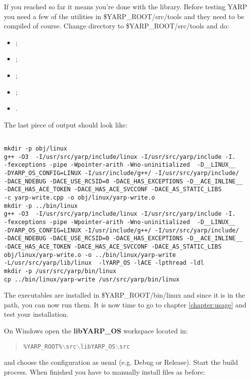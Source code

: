 If you reached so far it means you're done with the library. Before testing YARP you need a few of the utilities in \$YARP\_ROOT/src/tools and they need to be compiled of course. Change directory to \$YARP\_ROOT/src/tools and do:
\begin{itemize}
\item {};
\item {};
\item {};
\item {};
\item {}.
\end{itemize}

The last piece of output should look like:
\begin{verbatim}

mkdir -p obj/linux
g++ -O3  -I/usr/src/yarp/include/linux -I/usr/src/yarp/include -I.  
-fexceptions -pipe -Wpointer-arith -Wno-uninitialized  -D__LINUX__ 
-DYARP_OS_CONFIG=LINUX -I/usr/include/g++/ -I/usr/src/yarp/include/ 
-DACE_NDEBUG -DACE_USE_RCSID=0 -DACE_HAS_EXCEPTIONS -D__ACE_INLINE__ 
-DACE_HAS_ACE_TOKEN -DACE_HAS_ACE_SVCCONF -DACE_AS_STATIC_LIBS   
-c yarp-write.cpp -o obj/linux/yarp-write.o
mkdir -p ../bin/linux
g++ -O3  -I/usr/src/yarp/include/linux -I/usr/src/yarp/include -I.  
-fexceptions -pipe -Wpointer-arith -Wno-uninitialized  -D__LINUX__ 
-DYARP_OS_CONFIG=LINUX -I/usr/include/g++/ -I/usr/src/yarp/include/ 
-DACE_NDEBUG -DACE_USE_RCSID=0 -DACE_HAS_EXCEPTIONS -D__ACE_INLINE__ 
-DACE_HAS_ACE_TOKEN -DACE_HAS_ACE_SVCCONF -DACE_AS_STATIC_LIBS   
obj/linux/yarp-write.o -o ../bin/linux/yarp-write 
-L/usr/src/yarp/lib/linux  -lYARP_OS -lACE -lpthread -ldl
mkdir -p /usr/src/yarp/bin/linux
cp ../bin/linux/yarp-write /usr/src/yarp/bin/linux

\end{verbatim}

The executables are installed in \$YARP\_ROOT/bin/linux and since it is in the path, you can now run them. It is now time to go to chapter \ref{chapter:usage} and test your installation. 


On Windows open the {\bf libYARP\_OS} workspace located in:

\begin{quote}
{\tt \%YARP\_ROOT\%$\backslash$src$\backslash$libYARP\_OS$\backslash$src}
\end{quote}

\noindent and choose the configuration as usual (e.g. Debug or Release). Start the build process. When finished you have to manually install files as before:

